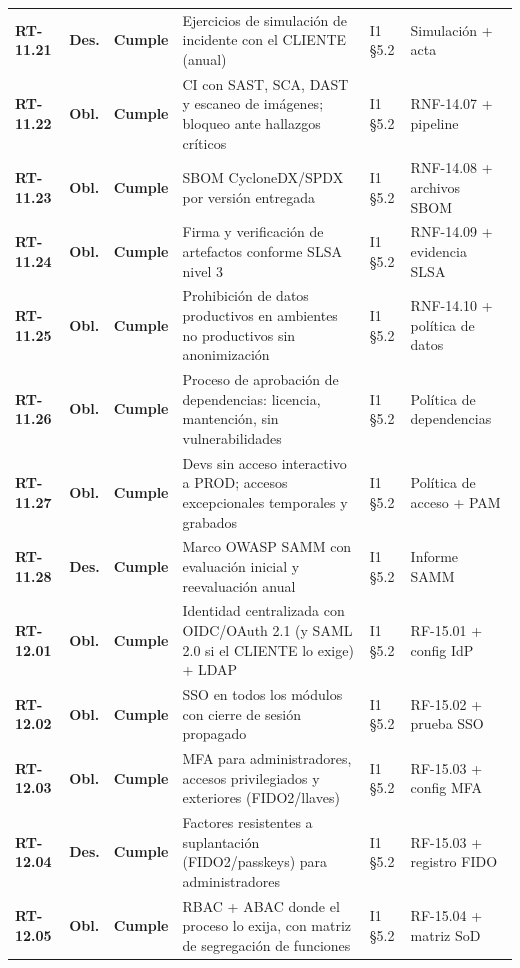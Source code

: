 \begin{small}
\begin{longtable}{@{}p{1.35cm} p{1.15cm} p{1.15cm} p{4.6cm} p{2.35cm} p{3.8cm}@{}}
\textbf{RT-11.21} & \textbf{Des.} & \textbf{Cumple} & Ejercicios de simulaci\'on de incidente con el CLIENTE (anual) & I1 §5.2 & Simulaci\'on + acta \\
\textbf{RT-11.22} & \textbf{Obl.} & \textbf{Cumple} & CI con SAST, SCA, DAST y escaneo de im\'agenes; bloqueo ante hallazgos cr\'iticos & I1 §5.2 & RNF-14.07 + pipeline \\
\textbf{RT-11.23} & \textbf{Obl.} & \textbf{Cumple} & SBOM CycloneDX/SPDX por versi\'on entregada & I1 §5.2 & RNF-14.08 + archivos SBOM \\
\textbf{RT-11.24} & \textbf{Obl.} & \textbf{Cumple} & Firma y verificaci\'on de artefactos conforme SLSA nivel 3 & I1 §5.2 & RNF-14.09 + evidencia SLSA \\
\textbf{RT-11.25} & \textbf{Obl.} & \textbf{Cumple} & Prohibici\'on de datos productivos en ambientes no productivos sin anonimizaci\'on & I1 §5.2 & RNF-14.10 + pol\'itica de datos \\
\textbf{RT-11.26} & \textbf{Obl.} & \textbf{Cumple} & Proceso de aprobaci\'on de dependencias: licencia, mantenci\'on, sin vulnerabilidades & I1 §5.2 & Pol\'itica de dependencias \\
\textbf{RT-11.27} & \textbf{Obl.} & \textbf{Cumple} & Devs sin acceso interactivo a PROD; accesos excepcionales temporales y grabados & I1 §5.2 & Pol\'itica de acceso + PAM \\
\textbf{RT-11.28} & \textbf{Des.} & \textbf{Cumple} & Marco OWASP SAMM con evaluaci\'on inicial y reevaluaci\'on anual & I1 §5.2 & Informe SAMM \\
\textbf{RT-12.01} & \textbf{Obl.} & \textbf{Cumple} & Identidad centralizada con OIDC/OAuth 2.1 (y SAML 2.0 si el CLIENTE lo exige) + LDAP & I1 §5.2 & RF-15.01 + config IdP \\
\textbf{RT-12.02} & \textbf{Obl.} & \textbf{Cumple} & SSO en todos los m\'odulos con cierre de sesi\'on propagado & I1 §5.2 & RF-15.02 + prueba SSO \\
\textbf{RT-12.03} & \textbf{Obl.} & \textbf{Cumple} & MFA para administradores, accesos privilegiados y exteriores (FIDO2/llaves) & I1 §5.2 & RF-15.03 + config MFA \\
\textbf{RT-12.04} & \textbf{Des.} & \textbf{Cumple} & Factores resistentes a suplantaci\'on (FIDO2/passkeys) para administradores & I1 §5.2 & RF-15.03 + registro FIDO \\
\textbf{RT-12.05} & \textbf{Obl.} & \textbf{Cumple} & RBAC + ABAC donde el proceso lo exija, con matriz de segregaci\'on de funciones & I1 §5.2 & RF-15.04 + matriz SoD \\

\end{longtable}
\end{small}
